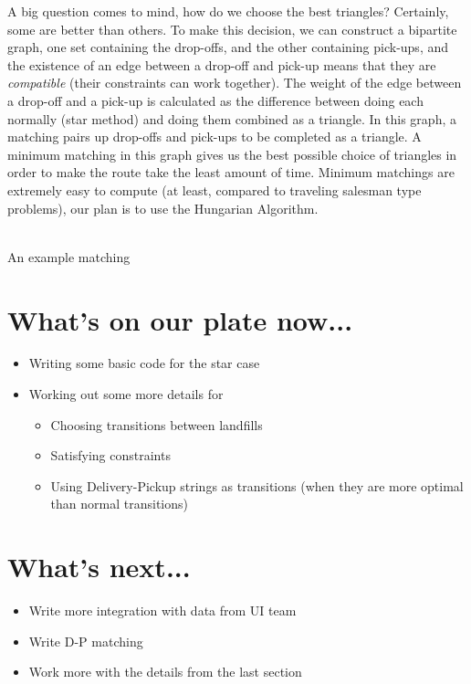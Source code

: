\documentclass{article}
\begin{document}
A big question comes to mind, how do we choose the best triangles? Certainly,
some are better than others. To make this decision, we can construct a bipartite
graph, one set containing the drop-offs, and the other containing pick-ups, and
the existence of an edge between a drop-off and pick-up means that they are
\emph{compatible} (their constraints can work together). The
weight of the edge between a drop-off and a pick-up is calculated as the
difference between doing each normally (star method) and doing them combined as
a triangle. In this graph, a matching pairs up drop-offs and pick-ups to be
completed as a triangle. A minimum matching in this graph gives us the best
possible choice of triangles in order to make the route take the least amount of
time. Minimum matchings are extremely easy to compute (at least, compared to
traveling salesman type problems), our plan is to use the Hungarian Algorithm.

\begin{center}
\\
An example matching
\end{center}

\section{What's on our plate now...}
\begin{itemize}
  \item Writing some basic code for the star case
  \item Working out some more details for
    \begin{itemize}
      \item Choosing transitions between landfills
      \item Satisfying constraints
      \item Using Delivery-Pickup strings as transitions (when they are more
        optimal than normal transitions)
    \end{itemize}
\end{itemize}
\section{What's next...}
\begin{itemize}
  \item Write more integration with data from UI team
  \item Write D-P matching
  \item Work more with the details from the last section
\end{itemize}
\end{document}

